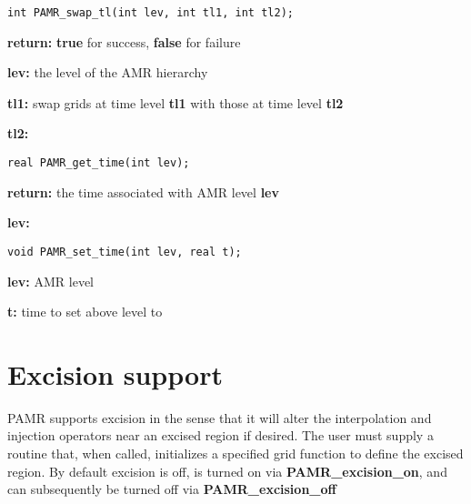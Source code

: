 \documentclass[aps,amssymb,unsortedaddress,nofootinbib]{revtex4}
\def\lsep{\itemsep 0.05in}
\begin{document}

\begin{verbatim}
int PAMR_swap_tl(int lev, int tl1, int tl2);
\end{verbatim}
\begin{list}{}{\lsep}
\item {\bf return:} {\bf true} for success, {\bf false} for failure
\item {\bf lev:} the level of the AMR hierarchy 
\item {\bf tl1:} swap grids at time level {\bf tl1} with those at time level {\bf tl2}
\item {\bf tl2:}
\end{list}


\begin{verbatim}
real PAMR_get_time(int lev);
\end{verbatim}
\begin{list}{}{\lsep}
\item {\bf return:} the time associated with AMR level {\bf lev}
\item {\bf lev:} 
\end{list}


\begin{verbatim}
void PAMR_set_time(int lev, real t);
\end{verbatim}
\begin{list}{}{\lsep}
\item {\bf lev:} AMR level
\item {\bf t:} time to set above level to
\end{list}


\section{Excision support}

PAMR supports excision in the sense that it will alter the interpolation and injection
operators near an excised region if desired. The user must supply a routine
that, when called, initializes a specified grid function to define the excised 
region. By default excision is off, is turned on via {\bf PAMR\_excision\_on},
and can subsequently be turned off via {\bf PAMR\_excision\_off}
\end{document}
